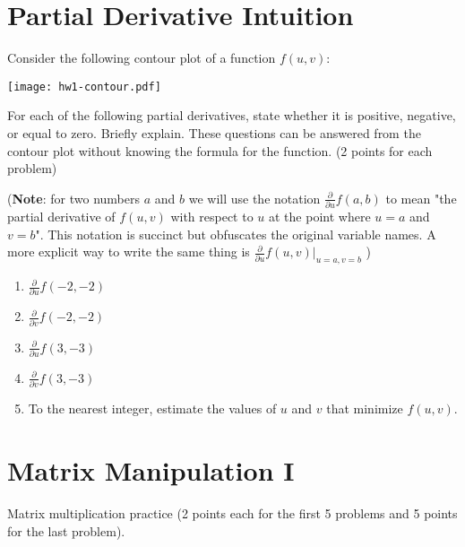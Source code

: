 \documentclass{article}
\begin{document}
\section{Partial Derivative Intuition}

Consider the following contour plot of a function $f(u,v)$:

\texttt{[image: hw1-contour.pdf]}

{\noindent} For each of the following partial derivatives, state whether it is positive, negative, or equal to zero. Briefly explain. These questions can be answered from the contour plot without knowing the formula for the function. (2 points for each problem)

{\noindent} ({\bf Note}: for two numbers $a$ and $b$ we will use the notation $\frac{\partial}{\partial u}f(a,b)$ to mean "the partial derivative of $f(u,v)$ with respect to $u$ at the point where $u=a$ and $v=b$". This notation is succinct but obfuscates the original variable names. A more explicit way to write the same thing is 
$\frac{\partial}{\partial u}f(u,v)|_{u=a,v=b}$
)

\begin{enumerate}
    \item $\frac{\partial}{\partial u} f(-2,-2)$
    \item $\frac{\partial}{\partial v} f(-2,-2)$
     \item $\frac{\partial}{\partial u} f(3,-3)$
     \item $\frac{\partial}{\partial v} f(3,-3)$
     \item To the nearest integer, estimate the values of $u$ and $v$ that minimize $f(u,v)$.
\end{enumerate}


\section{Matrix Manipulation I}

Matrix multiplication practice (2 points each for the first 5 problems and 5 points for the last problem).
\end{document}
